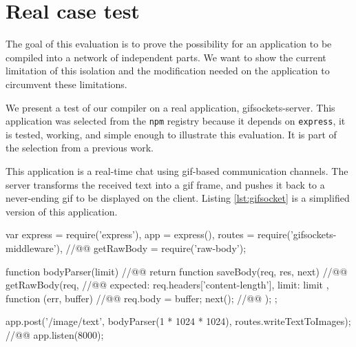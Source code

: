 \section{Real case test} \label{section:evaluation}

The goal of this evaluation is to prove the possibility for an application to be compiled into a network of independent parts.
We want to show the current limitation of this isolation and the modification needed on the application to circumvent these limitations.

We present a test of our compiler on a real application, gifsockets-server.
This application was selected from the \texttt{npm} registry because it depends on \texttt{express}, it is tested, working, and simple enough to illustrate this evaluation.
It is part of the selection from a previous work. %

This application is a real-time chat using gif-based communication channels.
The server transforms the received text into a gif frame, and pushes it back to a never-ending gif to be displayed on the client.
Listing \ref{lst:gifsocket} is a simplified version of this application.

\begin{code}[js, caption={Simplified version of gifsockets-server},label={lst:gifsocket}]
var express = require('express'),
    app = express(),
    routes = require('gifsockets-middleware'), //@\label{lst:gifsocket:gif-mw}@
    getRawBody = require('raw-body');

function bodyParser(limit) { //@\label{lst:gifsocket:bodyParser}@
  return function saveBody(req, res, next) { //@\label{lst:gifsocket:saveBody}@
    getRawBody(req, { //@\label{lst:gifsocket:getRawBody}@
      expected: req.headers['content-length'],
      limit: limit
    }, function (err, buffer) { //@\label{lst:gifsocket:callback}@
      req.body = buffer;
      next(); //@\label{lst:gifsocket:next}@
    });
  };
}

app.post('/image/text', bodyParser(1 * 1024 * 1024), routes.writeTextToImages); //@\label{lst:gifsocket:app.post}@
app.listen(8000);
\end{code}

